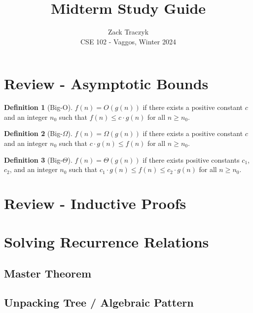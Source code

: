 \documentclass[12pt]{article}
\title{Midterm Study Guide}
\author{Zack Traczyk \\ CSE 102 - Vaggos, Winter 2024}
\date{}
\theoremstyle{definition}
\newtheorem{definition}{Definition}[section]
\begin{document}
	\maketitle

	\tableofcontents

	\pagebreak



	\section{Review - Asymptotic Bounds}

	\begin{definition}[Big-O]
		$f(n) = O(g(n))$ if there exists a positive constant $c$ and an integer
		$n_0$ such that $f(n) \leq c \cdot g(n)$ for all $n \geq n_0$.
	\end{definition}

	\begin{definition}[Big-$\Omega$]
		$f(n) = \Omega(g(n))$ if there exists a positive constant $c$ and an
		integer $n_0$ such that $c \cdot g(n) \leq f(n)$ for all $n \geq n_0$.
	\end{definition}

	\begin{definition}[Big-$\Theta$]
		$f(n) = \Theta(g(n))$ if there exists positive constants $c_1$, $c_2$,
		and an integer $n_0$ such that $c_1 \cdot g(n) \leq f(n) \leq c_2 \cdot
		g(n)$ for all $n \geq n_0$.
	\end{definition}

	\section{Review - Inductive Proofs}

	\section{Solving Recurrence Relations}

	\subsection{Master Theorem}

	\subsection{Unpacking Tree / Algebraic Pattern}
\end{document}

